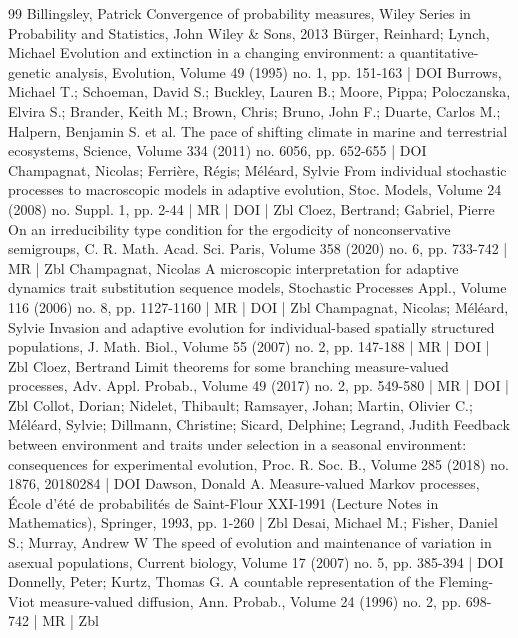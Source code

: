\documentclass[10pt]{amsart}
\theoremstyle{definition}\newtheorem{defi}[theo]{Definition}\newtheorem{rema}[theo]{Remark}\newtheorem{exam}[theo]{Example}\newtheorem{exem}[theo]{Example}\newtheorem{nota}[theo]{Notation}
\begin{document}
\begin{thebibliography}{99}
Billingsley, Patrick Convergence of probability measures, Wiley Series in Probability and Statistics, John Wiley \& Sons, 2013
Bürger, Reinhard; Lynch, Michael Evolution and extinction in a changing environment: a quantitative-genetic analysis, Evolution, Volume 49 (1995) no. 1, pp. 151-163 | DOI
Burrows, Michael T.; Schoeman, David S.; Buckley, Lauren B.; Moore, Pippa; Poloczanska, Elvira S.; Brander, Keith M.; Brown, Chris; Bruno, John F.; Duarte, Carlos M.; Halpern, Benjamin S. et al. The pace of shifting climate in marine and terrestrial ecosystems, Science, Volume 334 (2011) no. 6056, pp. 652-655 | DOI
Champagnat, Nicolas; Ferrière, Régis; Méléard, Sylvie From individual stochastic processes to macroscopic models in adaptive evolution, Stoc. Models, Volume 24 (2008) no. Suppl. 1, pp. 2-44 | MR | DOI | Zbl
Cloez, Bertrand; Gabriel, Pierre On an irreducibility type condition for the ergodicity of nonconservative semigroups, C. R. Math. Acad. Sci. Paris, Volume 358 (2020) no. 6, pp. 733-742 | MR | Zbl
Champagnat, Nicolas A microscopic interpretation for adaptive dynamics trait substitution sequence models, Stochastic Processes Appl., Volume 116 (2006) no. 8, pp. 1127-1160 | MR | DOI | Zbl
Champagnat, Nicolas; Méléard, Sylvie Invasion and adaptive evolution for individual-based spatially structured populations, J. Math. Biol., Volume 55 (2007) no. 2, pp. 147-188 | MR | DOI | Zbl
Cloez, Bertrand Limit theorems for some branching measure-valued processes, Adv. Appl. Probab., Volume 49 (2017) no. 2, pp. 549-580 | MR | DOI | Zbl
Collot, Dorian; Nidelet, Thibault; Ramsayer, Johan; Martin, Olivier C.; Méléard, Sylvie; Dillmann, Christine; Sicard, Delphine; Legrand, Judith Feedback between environment and traits under selection in a seasonal environment: consequences for experimental evolution, Proc. R. Soc. B., Volume 285 (2018) no. 1876, 20180284 | DOI
Dawson, Donald A. Measure-valued Markov processes, École d’été de probabilités de Saint-Flour XXI-1991 (Lecture Notes in Mathematics), Springer, 1993, pp. 1-260 | Zbl
Desai, Michael M.; Fisher, Daniel S.; Murray, Andrew W The speed of evolution and maintenance of variation in asexual populations, Current biology, Volume 17 (2007) no. 5, pp. 385-394 | DOI
Donnelly, Peter; Kurtz, Thomas G. A countable representation of the Fleming-Viot measure-valued diffusion, Ann. Probab., Volume 24 (1996) no. 2, pp. 698-742 | MR | Zbl

\end{thebibliography}
\end{document}
